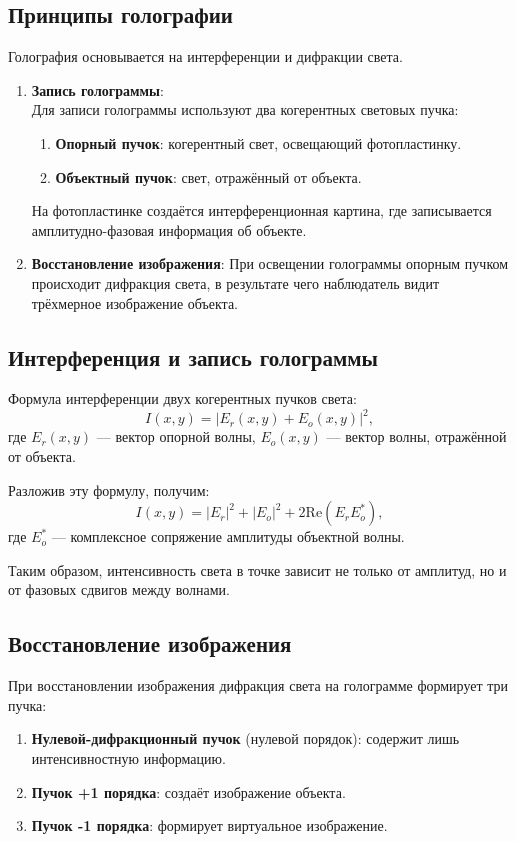 \documentclass[aps,twocolumn,secnumarabic,balancelastpage,amsmath,amssymb,nofootinbib, floatfix]{revtex4-1}
\begin{document}
\subsection{Принципы голографии} 

Голография основывается на интерференции и дифракции света.  
\begin{enumerate}
	\item \textbf{Запись голограммы}:\\
	Для записи голограммы используют два когерентных световых пучка:  
	\begin{enumerate}
		\item \textbf{Опорный пучок}: когерентный свет, освещающий фотопластинку.  
		\item \textbf{Объектный пучок}: свет, отражённый от объекта.  
	\end{enumerate}
На фотопластинке создаётся интерференционная картина, где записывается амплитудно-фазовая информация об объекте.  
	\item \textbf{Восстановление изображения}:  
	При освещении голограммы опорным пучком происходит дифракция света, в результате чего наблюдатель видит трёхмерное изображение объекта.  
	
\end{enumerate}

\subsection{Интерференция и запись голограммы}

Формула интерференции двух когерентных пучков света:  
\[
I(x, y) = |E_r(x, y) + E_o(x, y)|^2,
\]  
где \(E_r(x, y)\) — вектор опорной волны, \(E_o(x, y)\) — вектор волны, отражённой от объекта.  

Разложив эту формулу, получим:  
\[
I(x, y) = |E_r|^2 + |E_o|^2 + 2 \text{Re}(E_r E_o^*),
\]  
где \(E_o^*\) — комплексное сопряжение амплитуды объектной волны.  

Таким образом, интенсивность света в точке зависит не только от амплитуд, но и от фазовых сдвигов между волнами.  

\subsection{Восстановление изображения}

При восстановлении изображения дифракция света на голограмме формирует три пучка:  
\begin{enumerate}
	\item \textbf{Нулевой-дифракционный пучок} (нулевой порядок): содержит лишь интенсивностную информацию.  
	\item \textbf{Пучок +1 порядка}: создаёт изображение объекта.  
	\item \textbf{Пучок -1 порядка}: формирует виртуальное изображение.  
\end{enumerate}
\end{document}
